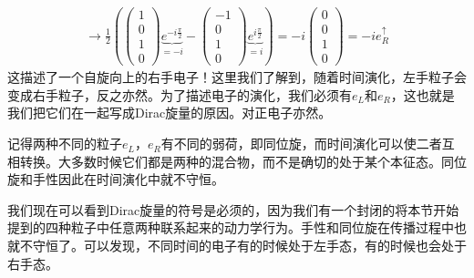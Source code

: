 \begin{align}
\to\frac{1}{2}\left(\left(\begin{matrix}1\\0\\1\\0\end{matrix}\right)\underbrace{e^{-i\frac{\pi}{2}}}_{=-i}-\left(\begin{matrix}-1\\0\\1\\0\end{matrix}\right)\underbrace{e^{i\frac{\pi}{2}}}_{=i}\right)=-i\left(\begin{matrix}0\\0\\1\\0\end{matrix}\right)=-ie_R^\uparrow
\end{align}
这描述了一个自旋向上的右手电子！这里我们了解到，随着时间演化，左手粒子会变成右手粒子，反之亦然。为了描述电子的演化，我们必须有$e_L$和$e_R$，这也就是我们把它们在一起写成Dirac旋量的原因。对正电子亦然。

记得两种不同的粒子$e_L$，$e_R$有不同的弱荷，即同位旋，而时间演化可以使二者互相转换。大多数时候它们都是两种的混合物，而不是确切的处于某个本征态。同位旋和手性因此在时间演化中就不守恒。

我们现在可以看到Dirac旋量的符号是必须的，因为我们有一个封闭的将本节开始提到的四种粒子中任意两种联系起来的动力学行为。手性和同位旋在传播过程中也就不守恒了。可以发现，不同时间的电子有的时候处于左手态，有的时候也会处于右手态。




